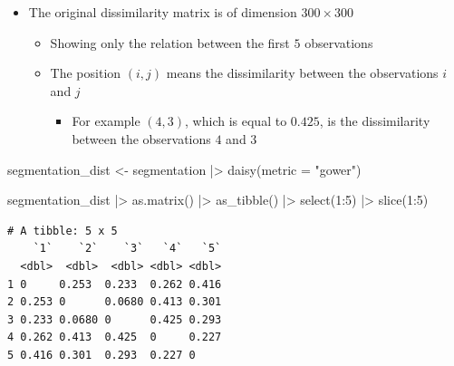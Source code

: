 \documentclass[
  ignorenonframetext,
]{beamer}
\newenvironment{Shaded}{\begin{snugshade}}{\end{snugshade}}
\newcommand{\AttributeTok}[1]{\textcolor[rgb]{0.40,0.45,0.13}{#1}}
\newcommand{\DecValTok}[1]{\textcolor[rgb]{0.68,0.00,0.00}{#1}}
\newcommand{\FunctionTok}[1]{\textcolor[rgb]{0.28,0.35,0.67}{#1}}
\newcommand{\NormalTok}[1]{\textcolor[rgb]{0.00,0.23,0.31}{#1}}
\newcommand{\OtherTok}[1]{\textcolor[rgb]{0.00,0.23,0.31}{#1}}
\newcommand{\SpecialCharTok}[1]{\textcolor[rgb]{0.37,0.37,0.37}{#1}}
\newcommand{\StringTok}[1]{\textcolor[rgb]{0.13,0.47,0.30}{#1}}
\providecommand{\tightlist}{%
  \setlength{\itemsep}{0pt}\setlength{\parskip}{0pt}}\usepackage{longtable,booktabs,array}
\begin{document}
\begin{frame}[fragile]{}
\label{section-19}
\begin{itemize}
\item
  The original dissimilarity matrix is of dimension \(300 \times 300\)

  \begin{itemize}
  \item
    Showing only the relation between the first \(5\) observations
  \item
    The position \((i,j)\) means the dissimilarity between the
    observations \(i\) and \(j\)

    \begin{itemize}
    \tightlist
    \item
      For example \((4, 3)\), which is equal to \(0.425\), is the
      dissimilarity between the observations \(4\) and \(3\)
    \end{itemize}
  \end{itemize}
\end{itemize}

\tiny

\begin{Shaded}
\begin{Highlighting}[]
\NormalTok{segmentation\_dist }\OtherTok{\textless{}{-}}\NormalTok{ segmentation }\SpecialCharTok{|\textgreater{}} 
  \FunctionTok{daisy}\NormalTok{(}\AttributeTok{metric =} \StringTok{"gower"}\NormalTok{)}

\NormalTok{segmentation\_dist }\SpecialCharTok{|\textgreater{}} 
  \FunctionTok{as.matrix}\NormalTok{() }\SpecialCharTok{|\textgreater{}} 
  \FunctionTok{as\_tibble}\NormalTok{() }\SpecialCharTok{|\textgreater{}} 
  \FunctionTok{select}\NormalTok{(}\StringTok{\textasciigrave{}}\AttributeTok{1}\StringTok{\textasciigrave{}}\SpecialCharTok{:}\StringTok{\textasciigrave{}}\AttributeTok{5}\StringTok{\textasciigrave{}}\NormalTok{) }\SpecialCharTok{|\textgreater{}} 
  \FunctionTok{slice}\NormalTok{(}\DecValTok{1}\SpecialCharTok{:}\DecValTok{5}\NormalTok{)}
\end{Highlighting}
\end{Shaded}

\begin{verbatim}
# A tibble: 5 x 5
    `1`    `2`    `3`   `4`   `5`
  <dbl>  <dbl>  <dbl> <dbl> <dbl>
1 0     0.253  0.233  0.262 0.416
2 0.253 0      0.0680 0.413 0.301
3 0.233 0.0680 0      0.425 0.293
4 0.262 0.413  0.425  0     0.227
5 0.416 0.301  0.293  0.227 0    
\end{verbatim}
\end{frame}
\end{document}
